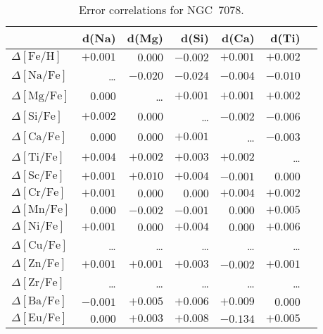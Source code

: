 \documentclass{aa}
\begin{document}
\begin{table}
\caption{Error correlations for NGC~7078.}
\label{tab:cerr7078}
\centering
{\small
\begin{tabular}{lrrrrrr}
\hline\hline
  & d(Na) & d(Mg) & d(Si) & d(Ca) & d(Ti) \\
\hline
$\Delta\mathrm{[Fe/H]}$ &  $+0.001$ & $0.000$ & $-0.002$ & $+0.001$ & $+0.002$  \\
$\Delta\mathrm{[Na/Fe]}$ & \ldots & $-0.020$ & $-0.024$ & $-0.004$ & $-0.010$  \\
$\Delta\mathrm{[Mg/Fe]}$ & $0.000$ & \ldots & $+0.001$ & $+0.001$ & $+0.002$  \\
$\Delta\mathrm{[Si/Fe]}$ & $+0.002$ & $0.000$ & \ldots & $-0.002$ & $-0.006$  \\
$\Delta\mathrm{[Ca/Fe]}$ & $0.000$ & $0.000$ & $+0.001$ & \ldots & $-0.003$  \\
$\Delta\mathrm{[Ti/Fe]}$ & $+0.004$ & $+0.002$ & $+0.003$ & $+0.002$ & \ldots  \\
$\Delta\mathrm{[Sc/Fe]}$ & $+0.001$ & $+0.010$ & $+0.004$ & $-0.001$ & $0.000$  \\
$\Delta\mathrm{[Cr/Fe]}$ & $+0.001$ & $0.000$ & $0.000$ & $+0.004$ & $+0.002$  \\
$\Delta\mathrm{[Mn/Fe]}$ & $0.000$ & $-0.002$ & $-0.001$ & $0.000$ & $+0.005$  \\
$\Delta\mathrm{[Ni/Fe]}$ & $+0.001$ & $0.000$ & $+0.004$ & $0.000$ & $+0.006$  \\
$\Delta\mathrm{[Cu/Fe]}$ & \ldots & \ldots & \ldots & \ldots & \ldots  \\
$\Delta\mathrm{[Zn/Fe]}$ & $+0.001$ & $+0.001$ & $+0.003$ & $-0.002$ & $+0.001$  \\
$\Delta\mathrm{[Zr/Fe]}$ & \ldots & \ldots & \ldots & \ldots & \ldots  \\
$\Delta\mathrm{[Ba/Fe]}$ & $-0.001$ & $+0.005$ & $+0.006$ & $+0.009$ & $0.000$  \\
$\Delta\mathrm{[Eu/Fe]}$ & $0.000$ & $+0.003$ & $+0.008$ & $-0.134$ & $+0.005$  \\
\hline
\end{tabular}
}
\end{table}
\end{document}

